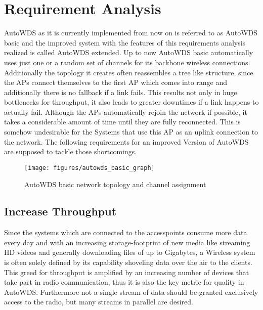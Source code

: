 \chapter{Requirement Analysis}
  AutoWDS as it is currently implemented from now on is referred to as AutoWDS basic and the improved system with the features of this requirements analysis realized 
  is called AutoWDS extended.
  Up to now AutoWDS basic automatically uses just one or a random set of channels for its backbone wireless connections. 
  Additionally the topology it creates often reassembles a tree like structure, since the APs connect themselves 
  to the first AP which comes into range and additionally there is no fallback if a link fails. This results not only in huge bottlenecks for throughput,
  it also leads to greater downtimes if a link happens to actually fail. Although the APs automatically rejoin the network if possible, it takes
  a considerable amount of time until they are fully reconnected. This is somehow undesirable for the Systems that use this AP as an uplink connection to
  the network. The following requirements for an improved Version of AutoWDS are supposed to tackle those shortcomings.
  
  \begin{figure}[t]
    \centering
    \texttt{[image: figures/autowds\_basic\_graph]}
    \caption{AutoWDS basic network topology and channel assignment}
    \label{fig:autowds_basic_graph}
  \end{figure}

  \section{Increase Throughput}
  Since the systems which are connected to the accesspoints consume more data every day and with an increasing storage-footprint of new media like streaming HD videos
  and generally downloading files of up to Gigabytes, a Wireless system is often solely defined by its capability shoveling data over the air to the clients.
  This greed for throughput is amplified by an increasing number of devices that take part in radio communication, 
  thus it is also the key metric for quality in AutoWDS. Furthermore not a single stream of data should be granted exclusively access to the radio, but
  many streams in parallel are desired.
  

